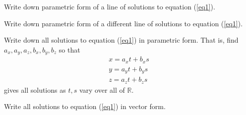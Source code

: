 \documentclass{article}
\newcommand{\R}{\mathbb{R}}
\begin{document}
	\begin{Enum}[resume]
		\item Write down parametric form of a line of solutions to equation (\ref{eq1}).
		\item Write down parametric form of a different line of solutions to equation (\ref{eq1}).
		\item Write down all solutions to equation (\ref{eq1}) in parametric form.  That is, find $a_x,
		a_y,a_z,b_x,b_y,b_z$ so that
		\[
			\begin{array}{l}
				x=a_x t+b_x s\\
				y=a_y t+b_y s\\
				z=a_z t+b_z s
			\end{array}
		\]
		gives all solutions as $t,s$ vary over all of $\R$.
		\item Write all solutions to equation (\ref{eq1}) in vector form.
	\end{Enum}
\end{document}
